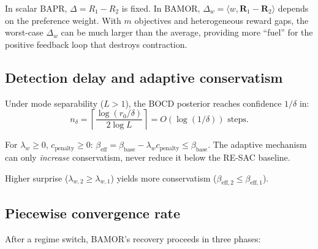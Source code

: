 \begin{remark}
In scalar BAPR, $\Delta = R_1 - R_2$ is fixed.  In BAMOR, $\Delta_w = \langle w, \mathbf{R}_1 - \mathbf{R}_2 \rangle$ depends on the preference weight.  With $m$ objectives and heterogeneous reward gaps, the worst-case $\Delta_w$ can be much larger than the average, providing more ``fuel'' for the positive feedback loop that destroys contraction.
\end{remark}

\subsection{Detection delay and adaptive conservatism}
\label{sec:detection}

\begin{theorem}
\label{thm:delay}
Under mode separability ($L > 1$), the BOCD posterior reaches confidence $1/\delta$ in:
\begin{equation}
    n_\delta = \left\lceil \frac{\log(r_0/\delta)}{2\log L} \right\rceil = O(\log(1/\delta)) \text{ steps}.
\end{equation}
\end{theorem}

\begin{theorem}
\label{thm:beta_safe}
For $\lambda_w \ge 0$, $c_{\mathrm{penalty}} \ge 0$: $\beta_{\mathrm{eff}} = \beta_{\mathrm{base}} - \lambda_w c_{\mathrm{penalty}} \le \beta_{\mathrm{base}}$.  The adaptive mechanism can only \emph{increase} conservatism, never reduce it below the RE-SAC baseline.
\end{theorem}

\begin{theorem}
Higher surprise ($\lambda_{w,2} \ge \lambda_{w,1}$) yields more conservatism ($\beta_{\mathrm{eff},2} \le \beta_{\mathrm{eff},1}$).
\end{theorem}

\subsection{Piecewise convergence rate}
\label{sec:piecewise}

After a regime switch, BAMOR's recovery proceeds in three phases:

